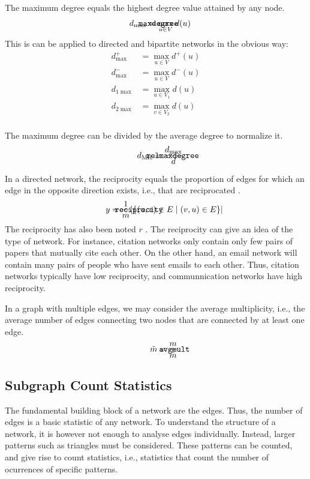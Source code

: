 \documentclass{article}
\def\mathnote#1{%
  \tag*{\rlap{\hspace\marginparsep\smash{\parbox[t]{\marginparwidth}{#1}}}}
}
\begin{document}
The maximum degree equals the highest degree value attained
by any node.
\begin{align}
  \mathnote{\texttt{maxdegree}}
  d_{\max} &= \max_{u\in V} d(u)
\end{align}
This is can be applied to directed and bipartite networks in the obvious way:
\begin{align*}
  d^+_{\max} &= \max_{u \in V} d^+(u) \\
  d^-_{\max} &= \max_{u \in V} d^-(u) \\
  d_{1 \max} &= \max_{u \in V_1} d(u) \\
  d_{2 \max} &= \max_{v \in V_2} d(u) \\
\end{align*}

The maximum degree can be divided by the average degree to normalize it.
\begin{align}
  \mathnote{\texttt{relmaxdegree}}
  d_{\mathrm{MR}} &= \frac {d_{\max}} {d}
\end{align}

In a directed network, the reciprocity equals the proportion of edges
for which an edge in the opposite direction exists, i.e., that are
reciprocated \citep{b866}.  
\begin{align}
  \mathnote{\texttt{reciprocity}}
  y = \frac 1 m  | \{ (u,v) \in E \mid (v,u) \in E \} | 
\end{align}
The reciprocity has also been noted $r$ \citep[e.g.][]{b867}. 
The reciprocity can give an idea of the type of network.  For instance,
citation networks only contain only few pairs of papers that mutually
cite each other.  On the other hand, an email network will contain many
pairs of people who have sent emails to each other.  Thus, citation
networks typically have low reciprocity, and communnication networks
have high reciprocity. 

In a graph with multiple edges, we may consider the average
multiplicity, i.e., the average number of edges connecting two nodes
that are connected by at least one edge. 
\begin{align}
  \mathnote{\texttt{avgmult}}
  \tilde{m} = \frac m {\bar{\bar m}} 
\end{align}

\subsection{Subgraph Count Statistics}
\label{sec:count-statistics}
The fundamental building block of a network are the edges.  Thus, the
number of edges is a basic statistic of any network.  To understand the
structure of a network, it is however not enough to analyse edges
individually.  Instead, larger patterns such as triangles must be
considered.  These patterns can be counted, and give rise to count
statistics, i.e., statistics that count the number of ocurrences of
specific patterns. 
\end{document}
